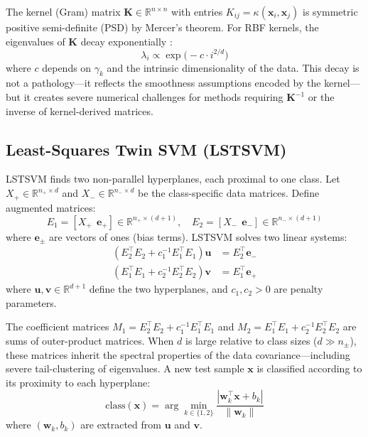 \documentclass[preprint,review,12pt]{elsarticle}
\begin{document}
The kernel (Gram) matrix $\bm{K} \in \mathbb{R}^{n \times n}$ with entries $K_{ij} = \kappa(\bm{x}_i, \bm{x}_j)$ is symmetric positive semi-definite (PSD) by Mercer's theorem. For RBF kernels, the eigenvalues of $\bm{K}$ decay exponentially \cite{hofmann2008kernel}:
\begin{equation}
\lambda_i \propto \exp\bigl(-c \cdot i^{2/d}\bigr)
\label{eq:eigenvalue_decay}
\end{equation}
where $c$ depends on $\gamma_k$ and the intrinsic dimensionality of the data. This decay is not a pathology---it reflects the smoothness assumptions encoded by the kernel---but it creates severe numerical challenges for methods requiring $\bm{K}^{-1}$ or the inverse of kernel-derived matrices.

\subsection{Least-Squares Twin SVM (LSTSVM)}
\label{sec:lstsvm_background}

LSTSVM \cite{kumar2009lstsvm} finds two non-parallel hyperplanes, each proximal to one class. Let $X_+ \in \mathbb{R}^{n_+ \times d}$ and $X_- \in \mathbb{R}^{n_- \times d}$ be the class-specific data matrices. Define augmented matrices:
\begin{equation}
E_1 = [X_+ ~~ \bm{e}_+] \in \mathbb{R}^{n_+ \times (d+1)}, \quad E_2 = [X_- ~~ \bm{e}_-] \in \mathbb{R}^{n_- \times (d+1)}
\end{equation}
where $\bm{e}_\pm$ are vectors of ones (bias terms). LSTSVM solves two linear systems:
\begin{align}
(E_2^\top E_2 + c_1^{-1} E_1^\top E_1) \bm{u} &= E_2^\top \bm{e}_- \label{eq:lstsvm_u} \\
(E_1^\top E_1 + c_2^{-1} E_2^\top E_2) \bm{v} &= E_1^\top \bm{e}_+ \label{eq:lstsvm_v}
\end{align}
where $\bm{u}, \bm{v} \in \mathbb{R}^{d+1}$ define the two hyperplanes, and $c_1, c_2 > 0$ are penalty parameters.

The coefficient matrices $M_1 = E_2^\top E_2 + c_1^{-1} E_1^\top E_1$ and $M_2 = E_1^\top E_1 + c_2^{-1} E_2^\top E_2$ are sums of outer-product matrices. When $d$ is large relative to class sizes ($d \gg n_\pm$), these matrices inherit the spectral properties of the data covariance---including severe tail-clustering of eigenvalues. A new test sample $\bm{x}$ is classified according to its proximity to each hyperplane:
\begin{equation}
\text{class}(\bm{x}) = \arg\min_{k \in \{1,2\}} \frac{|\bm{w}_k^\top \bm{x} + b_k|}{\|\bm{w}_k\|}
\end{equation}
where $(\bm{w}_k, b_k)$ are extracted from $\bm{u}$ and $\bm{v}$.
\end{document}
